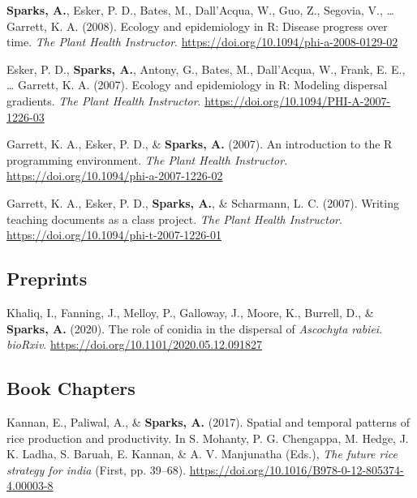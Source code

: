 \documentclass[11pt, a4paper]{awesome-cv}
\begin{document}
\leavevmode\hypertarget{ref-Sparks2008}{}%
\textbf{Sparks, A.}, Esker, P. D., Bates, M., Dall'Acqua, W., Guo, Z.,
Segovia, V., \ldots{} Garrett, K. A. (2008). Ecology and epidemiology in
{R}: Disease progress over time. \emph{The Plant Health Instructor}.
\url{https://doi.org/10.1094/phi-a-2008-0129-02}

\leavevmode\hypertarget{ref-Esker2007}{}%
Esker, P. D., \textbf{Sparks, A.}, Antony, G., Bates, M., Dall'Acqua,
W., Frank, E. E., \ldots{} Garrett, K. A. (2007). Ecology and
epidemiology in {R}: Modeling dispersal gradients. \emph{The Plant
Health Instructor}. \url{https://doi.org/10.1094/PHI-A-2007-1226-03}

\leavevmode\hypertarget{ref-Garrett2007}{}%
Garrett, K. A., Esker, P. D., \& \textbf{Sparks, A.} (2007). An
introduction to the {R} programming environment. \emph{The Plant Health
Instructor}. \url{https://doi.org/10.1094/phi-a-2007-1226-02}

\leavevmode\hypertarget{ref-Garrett2007a}{}%
Garrett, K. A., Esker, P. D., \textbf{Sparks, A.}, \& Scharmann, L. C.
(2007). Writing teaching documents as a class project. \emph{The Plant
Health Instructor}. \url{https://doi.org/10.1094/phi-t-2007-1226-01}

\endgroup

\hypertarget{preprints}{%
\subsection{Preprints}\label{preprints}}

\begingroup
\setlength{\parindent}{-0.5in}
\setlength{\leftskip}{0.5in}

\hypertarget{refs_preprints}{}
\leavevmode\hypertarget{ref-Khaliq2020}{}%
Khaliq, I., Fanning, J., Melloy, P., Galloway, J., Moore, K., Burrell,
D., \& \textbf{Sparks, A.} (2020). The role of conidia in the dispersal
of \emph{{Ascochyta} rabiei}. \emph{bioRxiv}.
\url{https://doi.org/10.1101/2020.05.12.091827}

\endgroup

\hypertarget{book-chapters}{%
\subsection{Book Chapters}\label{book-chapters}}

\begingroup
\setlength{\parindent}{-0.5in}
\setlength{\leftskip}{0.5in}

\hypertarget{refs_books}{}
\leavevmode\hypertarget{ref-Kannan2017}{}%
Kannan, E., Paliwal, A., \& \textbf{Sparks, A.} (2017). Spatial and
temporal patterns of rice production and productivity. In S. Mohanty, P.
G. Chengappa, M. Hedge, J. K. Ladha, S. Baruah, E. Kannan, \& A. V.
Manjunatha (Eds.), \emph{The future rice strategy for india} (First, pp.
39--68). \url{https://doi.org/10.1016/B978-0-12-805374-4.00003-8}
\end{document}

